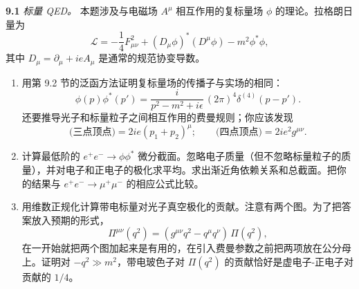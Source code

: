 \textbf{9.1} \emph{标量 QED。} 本题涉及与电磁场 $A^\mu$ 相互作用的复标量场 $\phi$ 的理论。拉格朗日量为
\begin{equation}
  \mathcal{L} = -\frac{1}{4}F^2_{\mu\nu} + (D_\mu\phi)^{*}(D^\mu\phi)
    - m^2\phi^{*}\phi ,
\end{equation}
其中 $D_\mu = \partial_\mu + ieA_\mu$ 是通常的规范协变导数。
\begin{enumerate}[label=(\alph*)]
  \item 用第 9.2 节的泛函方法证明复标量场的传播子与实场的相同：
    \begin{equation}
      \phi(p)\phi^{*}(p') = \frac{i}{p^2-m^2+i\epsilon}\,
        (2\pi)^4\delta^{(4)}(p-p') .
    \end{equation}
    还要推导光子和标量粒子之间相互作用的费曼规则；你应该发现
    \begin{equation}
      \text{(三点顶点)} = 2ie(p_1+p_2)^\mu; \qquad
      \text{(四点顶点)} = 2ie^2g^{\mu\nu} .
    \end{equation}
  \item 计算最低阶的 $e^{+}e^{-}\to\phi\phi^{*}$ 微分截面。忽略电子质量（但不忽略标量粒子的质量），并对电子和正电子的极化求平均。求出渐近角依赖关系和总截面。把你的结果与 $e^{+}e^{-}\to\mu^{+}\mu^{-}$ 的相应公式比较。
  \item 用维数正规化计算带电标量对光子真空极化的贡献。注意有两个图。为了把答案放入预期的形式，
    \begin{equation}
      \Pi^{\mu\nu}(q^2) = (g^{\mu\nu}q^2 - q^\mu q^\nu)\,\Pi(q^2) ,
    \end{equation}
    在一开始就把两个图加起来是有用的，在引入费曼参数之前把两项放在公分母上。证明对 $-q^2 \gg m^2$，带电玻色子对 $\Pi(q^2)$ 的贡献恰好是虚电子-正电子对贡献的 $1/4$。
\end{enumerate}

